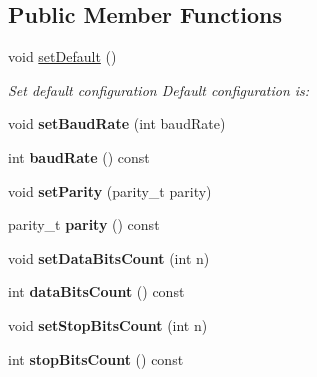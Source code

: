 \subsection*{Public Member Functions}
\begin{DoxyCompactItemize}
\item 
void \hyperlink{classmdt_serial_port_config_acabcdbda285314992582e5ffd413b555}{setDefault} ()
\begin{DoxyCompactList}\small\item\em Set default configuration Default configuration is: \end{DoxyCompactList}\item 
\hypertarget{classmdt_serial_port_config_a065f1875abc81e2aadd42a17d50167b1}{
void {\bfseries setBaudRate} (int baudRate)}
\label{classmdt_serial_port_config_a065f1875abc81e2aadd42a17d50167b1}

\item 
\hypertarget{classmdt_serial_port_config_a300e3a95bb527cc83fd872c90403b443}{
int {\bfseries baudRate} () const }
\label{classmdt_serial_port_config_a300e3a95bb527cc83fd872c90403b443}

\item 
\hypertarget{classmdt_serial_port_config_a1bc858db75808c23d1233244cff8d4fc}{
void {\bfseries setParity} (parity\_\-t parity)}
\label{classmdt_serial_port_config_a1bc858db75808c23d1233244cff8d4fc}

\item 
\hypertarget{classmdt_serial_port_config_a5bde62d17669a712e6a1cd149a76dcea}{
parity\_\-t {\bfseries parity} () const }
\label{classmdt_serial_port_config_a5bde62d17669a712e6a1cd149a76dcea}

\item 
\hypertarget{classmdt_serial_port_config_a71b78f5bea7c9a8eb66376aa4cee4344}{
void {\bfseries setDataBitsCount} (int n)}
\label{classmdt_serial_port_config_a71b78f5bea7c9a8eb66376aa4cee4344}

\item 
\hypertarget{classmdt_serial_port_config_abd7ff1cd99d2ae97489386b87638a210}{
int {\bfseries dataBitsCount} () const }
\label{classmdt_serial_port_config_abd7ff1cd99d2ae97489386b87638a210}

\item 
\hypertarget{classmdt_serial_port_config_a3c438a1008386bc8eb56c03786136b73}{
void {\bfseries setStopBitsCount} (int n)}
\label{classmdt_serial_port_config_a3c438a1008386bc8eb56c03786136b73}

\item 
\hypertarget{classmdt_serial_port_config_a78b9a842c6d4d15bafe4d66d9483e208}{
int {\bfseries stopBitsCount} () const }
\label{classmdt_serial_port_config_a78b9a842c6d4d15bafe4d66d9483e208}


\end{DoxyCompactItemize}
